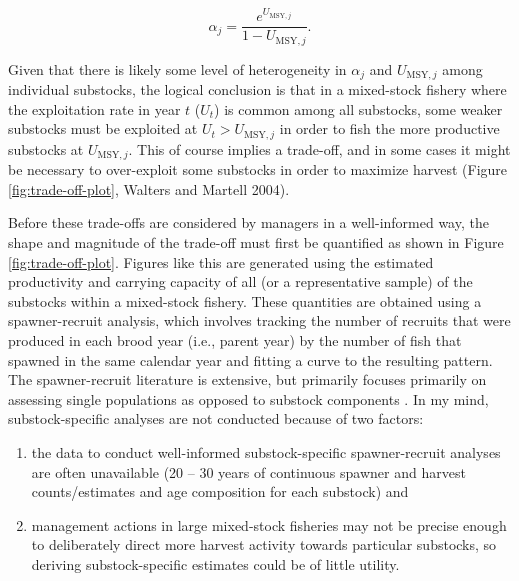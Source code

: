 \documentclass[12pt,]{book}
\theoremstyle{definition}
\theoremstyle{definition}
\theoremstyle{definition}
\theoremstyle{remark}
\begin{document}
\begin{equation}
  \alpha_j=\frac{e^{U_{\text{MSY},j}}}{1 - U_{\text{MSY},j}}.
  \label{eq:umsy-to-alpha}
\end{equation}

Given that there is likely some level of heterogeneity in \(\alpha_j\)
and \(U_{\text{MSY},j}\) among individual substocks, the logical
conclusion is that in a mixed-stock fishery where the exploitation rate
in year \(t\) (\(U_t\)) is common among all substocks, some weaker
substocks must be exploited at \(U_t > U_{\text{MSY},j}\) in order to
fish the more productive substocks at \(U_{\text{MSY},j}\). This of
course implies a trade-off, and in some cases it might be necessary to
over-exploit some substocks in order to maximize harvest (Figure
\ref{fig:trade-off-plot}, Walters and Martell 2004).

Before these trade-offs are considered by managers in a well-informed
way, the shape and magnitude of the trade-off must first be quantified
as shown in Figure \ref{fig:trade-off-plot}. Figures like this are
generated using the estimated productivity and carrying capacity of all
(or a representative sample) of the substocks within a mixed-stock
fishery. These quantities are obtained using a spawner-recruit analysis,
which involves tracking the number of recruits that were produced in
each brood year (i.e., parent year) by the number of fish that spawned
in the same calendar year and fitting a curve to the resulting pattern.
The spawner-recruit literature is extensive, but primarily focuses
primarily on assessing single populations as opposed to substock
components \citep[but see the work on Skeena River, British Columbia
sockeye salmon \emph{O. nerka}
substocks;][]{walters-etal-2008, korman-english-2013}. In my mind,
substock-specific analyses are not conducted because of two factors:

\begin{enumerate}
\def\labelenumi{(\arabic{enumi})}
\item
  the data to conduct well-informed substock-specific spawner-recruit
  analyses are often unavailable (20 -- 30 years of continuous spawner
  and harvest counts/estimates and age composition for each substock)
  and
\item
  management actions in large mixed-stock fisheries may not be precise
  enough to deliberately direct more harvest activity towards particular
  substocks, so deriving substock-specific estimates could be of little
  utility.
\end{enumerate}
\end{document}
